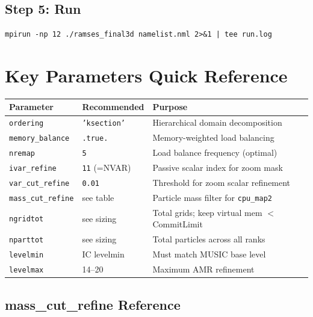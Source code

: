 \documentclass[11pt,fleqn]{book}
\begin{document}
\subsection{Step 5: Run}

\begin{codebox}
\begin{lstlisting}[style=bash,numbers=none]
mpirun -np 12 ./ramses_final3d namelist.nml 2>&1 | tee run.log
\end{lstlisting}
\end{codebox}

\section{Key Parameters Quick Reference}

\begin{center}
\begin{longtable}{L{3.8cm} C{2.5cm} L{6.5cm}}
\toprule
\textbf{Parameter} & \textbf{Recommended} & \textbf{Purpose} \\
\midrule
\endhead
\texttt{ordering} & \texttt{'ksection'} & Hierarchical domain decomposition \\
\texttt{memory\_balance} & \texttt{.true.} & Memory-weighted load balancing \\
\texttt{nremap} & \texttt{5} & Load balance frequency (optimal) \\
\midrule
\texttt{ivar\_refine} & \texttt{11} (=NVAR) & Passive scalar index for zoom mask \\
\texttt{var\_cut\_refine} & \texttt{0.01} & Threshold for zoom scalar refinement \\
\texttt{mass\_cut\_refine} & see table & Particle mass filter for \texttt{cpu\_map2} \\
\midrule
\texttt{ngridtot} & see sizing & Total grids; keep virtual mem $<$ CommitLimit \\
\texttt{nparttot} & see sizing & Total particles across all ranks \\
\texttt{levelmin} & IC levelmin & Must match MUSIC base level \\
\texttt{levelmax} & 14--20 & Maximum AMR refinement \\
\bottomrule
\end{longtable}
\end{center}

\subsection{mass\_cut\_refine Reference}
\end{document}
